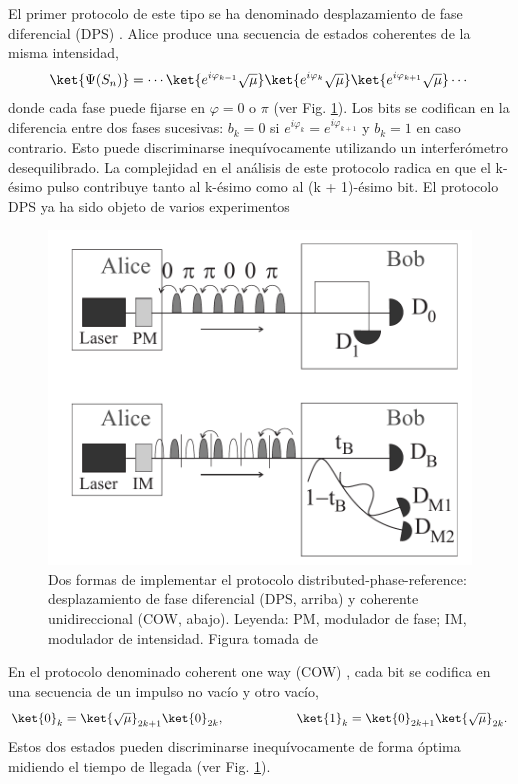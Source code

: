 \documentclass[a4paper,11pt]{book} %
\numberwithin{equation}{chapter}
\begin{document}
El primer protocolo de este tipo se ha denominado desplazamiento de fase diferencial (DPS) \cite{bib_Phase_Inoue_2002,bib_Phase_Inoue_2003}. Alice produce una secuencia de estados coherentes de la misma intensidad,
	\begin{equation}
	\ket{ \Psi (S_n)} = \cdots \ket{e^{i \varphi_{k-1}} \sqrt{\mu}} \ket{e^{i \varphi_k} \sqrt{\mu}} \ket{e^{i \varphi_{k+1}} \sqrt{\mu}} \cdots
	\end{equation}
donde cada fase puede fijarse en $\varphi = 0$ o $\pi$ (ver Fig. \ref{Fig_QKD_DFR}). Los bits se codifican en la diferencia entre dos fases sucesivas: $b_k = 0$ si $e^{i \varphi_k} = e^{i \varphi_{k+1}}$ y $b_k = 1$ en caso contrario. Esto puede discriminarse inequívocamente utilizando un interferómetro desequilibrado. La complejidad en el análisis de este protocolo radica en que el k-ésimo pulso contribuye tanto al k-ésimo como al (k + 1)-ésimo bit. El protocolo DPS ya ha sido objeto de varios experimentos \cite{bib_QKD_DFR_Takesue_2005,bib_QKD_DFR_Takesue_2007,bib_QKD_DFR_Diamanti_2006}

	\begin{figure}[t]
	\centering 
	\includegraphics[width=0.6\linewidth]{Figuras/Fig_QKD_DFR.png}
	\caption{Dos formas de implementar el protocolo distributed-phase-reference: desplazamiento de fase diferencial (DPS, arriba) y coherente unidireccional (COW, abajo). Leyenda: PM, modulador de fase; IM, modulador de intensidad. Figura tomada de \cite{bib_QKD_resumen}}
	\label{Fig_QKD_DFR}
	\end{figure}

En el protocolo denominado coherent one way (COW) \cite{bib_Phase_gisin2004practical,bib_Phase_Stucki_2005}, cada bit se codifica en una secuencia de un impulso no vacío y otro vacío,
	\begin{equation}
	\ket{0}_k = \ket{\sqrt{\mu}}_{2k+1} \ket{0}_{2k}, \hspace{2cm} 
	\ket{1}_k = \ket{0}_{2k+1} \ket{\sqrt{\mu}}_{2k}.
	\end{equation}
Estos dos estados pueden discriminarse inequívocamente de forma óptima midiendo el tiempo de llegada (ver Fig. \ref{Fig_QKD_DFR}). 
\end{document}
